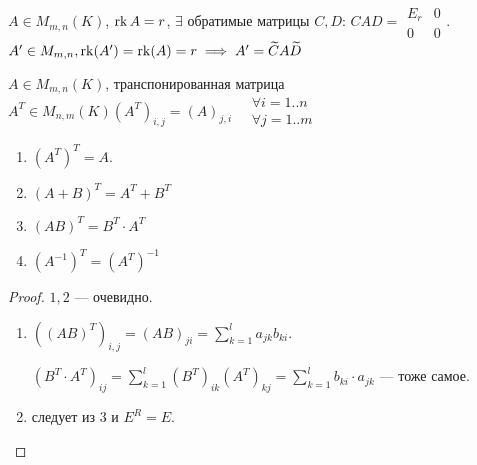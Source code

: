 \begin{remark}
    $A \in M_{m, n}(K)$,  $\operatorname{rk} A = r$,  $\exists $ обратимые матрицы  $C, D$:  $CAD = \begin{array}{|c|c|} E_r & 0 \\ \hline 0 & 0 \end{array}$. $ A' \in M_{m,n}, \operatorname{rk}(A') = \operatorname{rk}(A) = r \implies A' = \widetilde{C} A \widetilde{D}$
\end{remark}
\begin{definition}
    $A \in M_{m, n}(K)$, транспонированная матрица  $A^T \in M_{n, m}(K) (A^T)_{i, j} = (A)_{j, i} \quad \substack{\forall i=1..n \\ \forall j=1..m}$
\end{definition}
\begin{properties}
    \begin{enumerate}
        \item $(A^T)^T = A$.
        \item  $(A+B)^T = A^T + B^T$
        \item  $(AB)^T = B^T \cdot A^T$
        \item  $(A^{-1})^T = (A^T)^{-1}$
    \end{enumerate}
\end{properties}
\begin{proof}
    $1, 2$ --- очевидно.
     \begin{enumerate}
         \addtocounter{enumi}{2}
     \item $((AB)^T)_{i, j} = (AB)_{ji} = \sum\limits_{k=1}^l a_{jk}b_{ki}$.

         $(B^T\cdot A^T)_{ij} = \sum\limits_{k=1}^l (B^T)_{ik} (A^T)_{kj} = \sum\limits_{k=1}^{l} b_{ki} \cdot a_{jk}$ --- тоже самое.
     \item следует из  $3$ и  $E^R =E$.
    \end{enumerate}
\end{proof}


